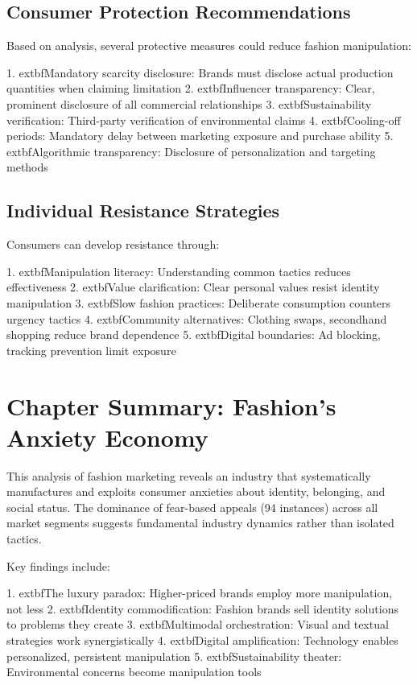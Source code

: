 \subsection{Consumer Protection Recommendations}

Based on analysis, several protective measures could reduce fashion manipulation:

1. 	extbf{Mandatory scarcity disclosure}: Brands must disclose actual production quantities when claiming limitation
2. 	extbf{Influencer transparency}: Clear, prominent disclosure of all commercial relationships
3. 	extbf{Sustainability verification}: Third-party verification of environmental claims
4. 	extbf{Cooling-off periods}: Mandatory delay between marketing exposure and purchase ability
5. 	extbf{Algorithmic transparency}: Disclosure of personalization and targeting methods

\subsection{Individual Resistance Strategies}

Consumers can develop resistance through:

1. 	extbf{Manipulation literacy}: Understanding common tactics reduces effectiveness
2. 	extbf{Value clarification}: Clear personal values resist identity manipulation
3. 	extbf{Slow fashion practices}: Deliberate consumption counters urgency tactics
4. 	extbf{Community alternatives}: Clothing swaps, secondhand shopping reduce brand dependence
5. 	extbf{Digital boundaries}: Ad blocking, tracking prevention limit exposure

\section{Chapter Summary: Fashion's Anxiety Economy}
\label{sec:fashion_summary}

This analysis of fashion marketing reveals an industry that systematically manufactures and exploits consumer anxieties about identity, belonging, and social status. The dominance of fear-based appeals (94 instances) across all market segments suggests fundamental industry dynamics rather than isolated tactics.

Key findings include:

1. 	extbf{The luxury paradox}: Higher-priced brands employ more manipulation, not less
2. 	extbf{Identity commodification}: Fashion brands sell identity solutions to problems they create
3. 	extbf{Multimodal orchestration}: Visual and textual strategies work synergistically
4. 	extbf{Digital amplification}: Technology enables personalized, persistent manipulation
5. 	extbf{Sustainability theater}: Environmental concerns become manipulation tools

